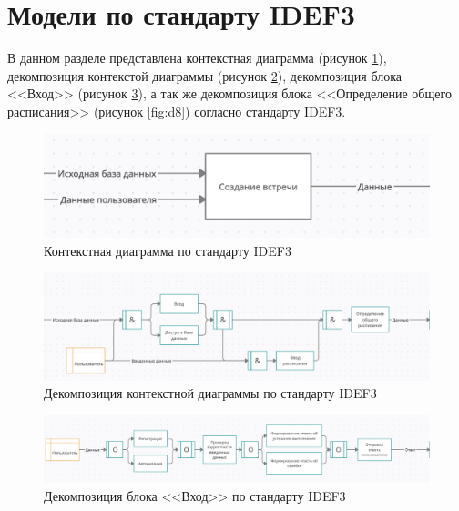 \documentclass[14pt]{extreport}
\begin{document}
    \section{Модели по стандарту IDEF3}
        В данном разделе представлена контекстная диаграмма (рисунок \ref{fig:d5}), декомпозиция контекстой диаграммы (рисунок \ref{fig:d6}), декомпозиция блока <<Вход>> (рисунок \ref{fig:d7}), а так же декомпозиция блока <<Определение общего расписания>> (рисунок \ref{fig:d8}) согласно стандарту IDEF3. 
        \begin{landscape}
            \begin{figure}[h]   
                \centering
                \includegraphics[width=0.7\linewidth]{img/IDEF3-0.png}
                \caption{ Контекстная диаграмма по стандарту IDEF3}
                \label{fig:d5}
            \end{figure}

            \begin{figure}[h]   
                \centering
                \includegraphics[width=0.7\linewidth]{img/IDEF3-1-0.png}
                \caption{ Декомпозиция контекстной диаграммы по стандарту IDEF3}
                \label{fig:d6}
            \end{figure}

            \begin{figure}[h]   
                \centering
                \includegraphics[width=0.9\linewidth]{img/IDEF3-2-0.png}
                \caption{ Декомпозиция блока <<Вход>> по стандарту IDEF3}
                \label{fig:d7}
            \end{figure}


\end{landscape}
\end{document}
